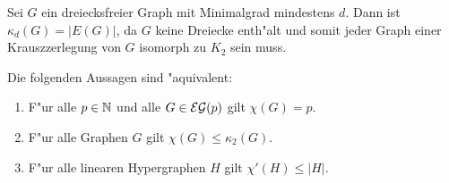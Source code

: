 \begin{example}
  Sei $G$ ein dreiecksfreier Graph mit Minimalgrad mindestens $d$. Dann ist $\kappa_{d}(G) = |E(G)|$, da $G$ keine Dreiecke enth"alt und somit jeder Graph einer Krauszzerlegung von $G$ isomorph zu $K_{2}$ sein muss. 
\end{example}

%
\begin{theorem}
  Die folgenden Aussagen sind "aquivalent:
  \begin{enumerate}[label={\rm(\alph*)}]
    \item F"ur alle $p\in{\mathbb{N}}$ und alle $G\in{\cal EG}(p)$ gilt $\chi(G) = p$.
    \item F"ur alle Graphen $G$ gilt $\chi(G) \leq \kappa_{2}(G)$.
    \item F"ur alle linearen Hypergraphen $H$ gilt $\chi'(H) \leq |H|$.
  \end{enumerate}
  \label{thm:equivefl}
\end{theorem}

